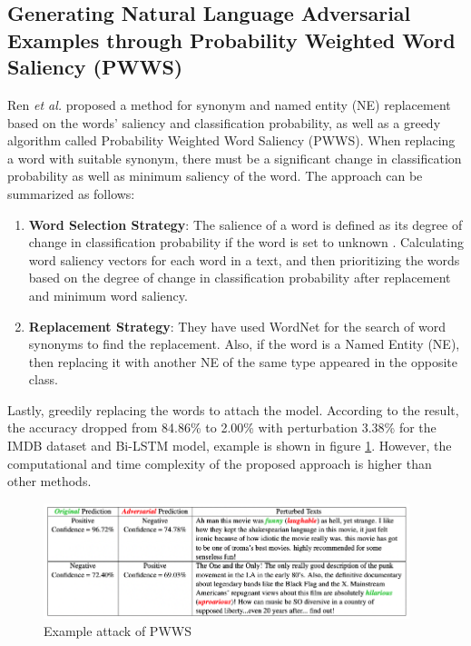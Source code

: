 \documentclass[%
	BCOR=8mm, %
	DIV=12,
	toc=bibliography, %
	toc=listof, %
	oneside, %
	egregdoesnotlikesansseriftitles, %
	]{scrbook}
\begin{document}
\subsection{Generating Natural Language Adversarial Examples through Probability Weighted Word Saliency (PWWS)}
\label{subsection:generatingadversarialexample}
Ren \textit{et al.} \cite{ren_generating_2019} proposed a method for synonym and named entity (NE) replacement based on the words' saliency and classification probability, as well as a greedy algorithm called Probability Weighted Word Saliency (PWWS). When replacing a word with suitable synonym, there must be a significant change in classification probability as well as minimum saliency of the word. The approach can be summarized as follows:

\begin{enumerate}
    \item \textbf{Word Selection Strategy}:  
   The salience of a word is defined as its degree of change in classification probability if the word is set to unknown \cite{li_understanding_2017}. Calculating word saliency vectors for each word in a text, and then prioritizing the words based on the degree of change in classification probability after replacement and minimum word saliency.
    \item \textbf{Replacement Strategy}: They have used WordNet for the search of word synonyms to find the replacement. Also, if the word is a Named Entity (NE), then replacing it with another NE of the same type appeared in the opposite class.
\end{enumerate}
Lastly, greedily replacing the words to attach the model. According to the result, the accuracy dropped from 84.86\% to 2.00\% with perturbation 3.38\% for the IMDB dataset and Bi-LSTM model, example is shown in figure \ref{diag:pwwsexp}. However, the computational and time complexity of the proposed approach is higher than other methods.
\begin{figure}[H]
    \centering
    \includegraphics[width=0.95\textwidth]{img/PWWSexample.png}
    \caption[Example of PWWS attack recipe]{Example attack of PWWS\cite{ren_generating_2019} }
    \label{diag:pwwsexp}
\end{figure}
\end{document}
